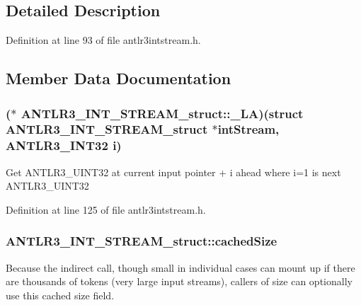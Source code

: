 \subsection{Detailed Description}


Definition at line 93 of file antlr3intstream.\-h.



\subsection{Member Data Documentation}
\hypertarget{struct_a_n_t_l_r3___i_n_t___s_t_r_e_a_m__struct_abc96e456bf8fdbb01b869b1ab9e27e5a}{
\subsubsection[{\-\_\-\-L\-A}]{($\ast$ A\-N\-T\-L\-R3\-\_\-\-I\-N\-T\-\_\-\-S\-T\-R\-E\-A\-M\-\_\-struct\-::\-\_\-\-L\-A)(struct {\bf A\-N\-T\-L\-R3\-\_\-\-I\-N\-T\-\_\-\-S\-T\-R\-E\-A\-M\-\_\-struct} $\ast$int\-Stream, {\bf A\-N\-T\-L\-R3\-\_\-\-I\-N\-T32} {\bf i})}}\label{struct_a_n_t_l_r3___i_n_t___s_t_r_e_a_m__struct_abc96e456bf8fdbb01b869b1ab9e27e5a}
Get A\-N\-T\-L\-R3\-\_\-\-U\-I\-N\-T32 at current input pointer + i ahead where i=1 is next A\-N\-T\-L\-R3\-\_\-\-U\-I\-N\-T32 

Definition at line 125 of file antlr3intstream.\-h.

\hypertarget{struct_a_n_t_l_r3___i_n_t___s_t_r_e_a_m__struct_a4d0db22c90c1cff328305c2369c28c1a}{
\subsubsection[{cached\-Size}]{ A\-N\-T\-L\-R3\-\_\-\-I\-N\-T\-\_\-\-S\-T\-R\-E\-A\-M\-\_\-struct\-::cached\-Size}}\label{struct_a_n_t_l_r3___i_n_t___s_t_r_e_a_m__struct_a4d0db22c90c1cff328305c2369c28c1a}
Because the indirect call, though small in individual cases can mount up if there are thousands of tokens (very large input streams), callers of size can optionally use this cached size field. 

